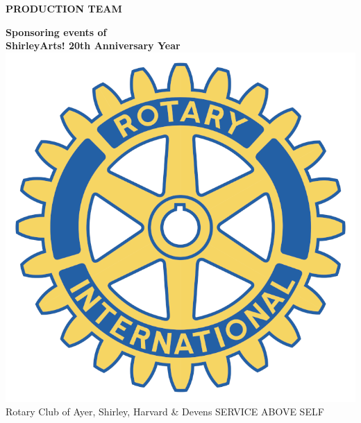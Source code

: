 \documentclass[12pt, a5paper, oneside]{article}
\begin{document}
\pagebreak
\begin{center}
\Large \textbf{PRODUCTION TEAM}
\end{center}
\pagebreak
\begin{center}
\large\textbf{Sponsoring events of\\  
ShirleyArts! 20th Anniversary Year} \\
\includegraphics[scale=0.15]{media/rotary_international.png}\\
Rotary Club of Ayer, Shirley, Harvard \& Devens 
SERVICE ABOVE SELF\\
\end{center} 
\normalsize
\end{document}
